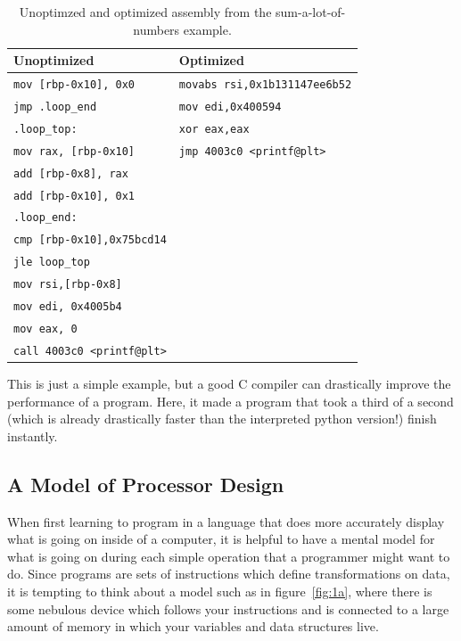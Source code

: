 \begin{table}[h]
	\centering
\begin{tabular}{l | l}
	\hline
	\textbf{Unoptimized} & \textbf{Optimized}\\
	\hline
	\texttt{mov [rbp-0x10], 0x0}	&\texttt{movabs rsi,0x1b131147ee6b52} \\
	\texttt{jmp .loop\_end			}	&\texttt{mov edi,0x400594} \\
	\texttt{.loop\_top:                } &\texttt{xor eax,eax   } \\
	\texttt{mov rax, [rbp-0x10]				}	&\texttt{jmp 4003c0 <printf@plt>}\\
	\texttt{add [rbp-0x8], rax				}	&\texttt{	} \\
	\texttt{add [rbp-0x10], 0x1				}	&\texttt{ }\\	
	\texttt{.loop\_end:                       } &\texttt{} \\
	\texttt{cmp [rbp-0x10],0x75bcd14} &\texttt{} \\
	\texttt{jle loop\_top} &\texttt{} \\
	\texttt{mov rsi,[rbp-0x8]} &\texttt{} \\
	\texttt{mov edi, 0x4005b4} &\texttt{} \\
	\texttt{mov eax, 0} &\texttt{} \\
	\texttt{call 4003c0 <printf@plt>} &\texttt{} \\
\end{tabular}
	\caption{Unoptimzed and optimized assembly from the sum-a-lot-of-numbers example.}
	\label{table:assem-1}
\end{table}

This is just a simple example, but a good C compiler can drastically improve the performance of a
program. Here, it made a program that took a third of a second (which is already drastically faster than
the interpreted python version!) finish instantly.

\subsection{A Model of Processor Design}

When first learning to program in a language that does more accurately display what is going on
inside of a computer, it is helpful to have a mental model for what is going on during each
simple operation that a programmer might want to do. Since programs are sets of instructions
which define transformations on data, it is tempting to think about a model such as in figure~\ref{fig:1a},
where there is some nebulous device which follows your instructions and is connected to a large amount
of memory in which your variables and data structures live.


